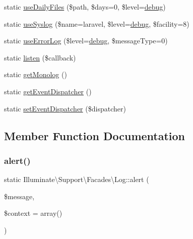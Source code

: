 \begin{DoxyCompactItemize}
static \mbox{\hyperlink{class_illuminate_1_1_support_1_1_facades_1_1_log_a13cb363de24b3c76b32460c18e1a99d1}{use\+Daily\+Files}} (\$path, \$days=0, \$level=\textquotesingle{}\mbox{\hyperlink{class_illuminate_1_1_support_1_1_facades_1_1_log_a4a6186c4b8318f3096e043e59a2683f8}{debug}}\textquotesingle{})
\item 
static \mbox{\hyperlink{class_illuminate_1_1_support_1_1_facades_1_1_log_a351af1020b92d8bbd8fa6179234a27f4}{use\+Syslog}} (\$name=\textquotesingle{}laravel\textquotesingle{}, \$level=\textquotesingle{}\mbox{\hyperlink{class_illuminate_1_1_support_1_1_facades_1_1_log_a4a6186c4b8318f3096e043e59a2683f8}{debug}}\textquotesingle{}, \$facility=8)
\item 
static \mbox{\hyperlink{class_illuminate_1_1_support_1_1_facades_1_1_log_a703c784c074caa43b7b68579e609fa48}{use\+Error\+Log}} (\$level=\textquotesingle{}\mbox{\hyperlink{class_illuminate_1_1_support_1_1_facades_1_1_log_a4a6186c4b8318f3096e043e59a2683f8}{debug}}\textquotesingle{}, \$message\+Type=0)
\item 
static \mbox{\hyperlink{class_illuminate_1_1_support_1_1_facades_1_1_log_a7df6ff6379ae011b0ad9db602ceae2b6}{listen}} (\$callback)
\item 
static \mbox{\hyperlink{class_illuminate_1_1_support_1_1_facades_1_1_log_a0c00c7c59ce5ce04e3ed5f29e17788ab}{get\+Monolog}} ()
\item 
static \mbox{\hyperlink{class_illuminate_1_1_support_1_1_facades_1_1_log_a1006c5d64b4b975b55efb6c11ec0b3c8}{get\+Event\+Dispatcher}} ()
\item 
static \mbox{\hyperlink{class_illuminate_1_1_support_1_1_facades_1_1_log_adf269d76df35f73950371f4432804e38}{set\+Event\+Dispatcher}} (\$dispatcher)
\end{DoxyCompactItemize}


\subsection{Member Function Documentation}
\mbox{\label{class_illuminate_1_1_support_1_1_facades_1_1_log_a65867128ee36796382e33c5546f18aae}} 
\subsubsection{\texorpdfstring{alert()}{alert()}}
{\footnotesize\ttfamily static Illuminate\textbackslash{}\+Support\textbackslash{}\+Facades\textbackslash{}\+Log\+::alert (\begin{DoxyParamCaption}\item[{}]{\$message,  }\item[{}]{\$context = {\ttfamily array()} }\end{DoxyParamCaption})\hspace{0.3cm}{\ttfamily [static]}}

